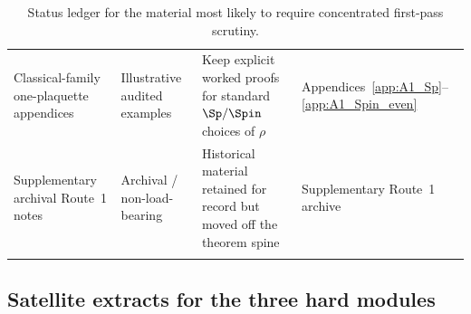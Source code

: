 \begin{longtable}{@{}
>{\RaggedRight\arraybackslash}p{}
>{\RaggedRight\arraybackslash}p{}
>{\RaggedRight\arraybackslash}p{}
>{\RaggedRight\arraybackslash}p{}@{}}
Classical-family one-plaquette appendices & Illustrative audited examples & Keep explicit worked proofs for standard $\Sp/\Spin$ choices of $\rho$ & Appendices~\ref{app:A1_Sp}--\ref{app:A1_Spin_even}\\[0.35em]

Supplementary archival Route~1 notes & Archival / non-load-bearing & Historical material retained for record but moved off the theorem spine & Supplementary Route~1 archive\\
\bottomrule
\caption{Status ledger for the material most likely to require concentrated first-pass scrutiny.}\label{tab:status_ledger}
\end{longtable}
\endgroup

\subsection{Satellite extracts for the three hard modules}
\label{subsec:hard_module_extracts}

